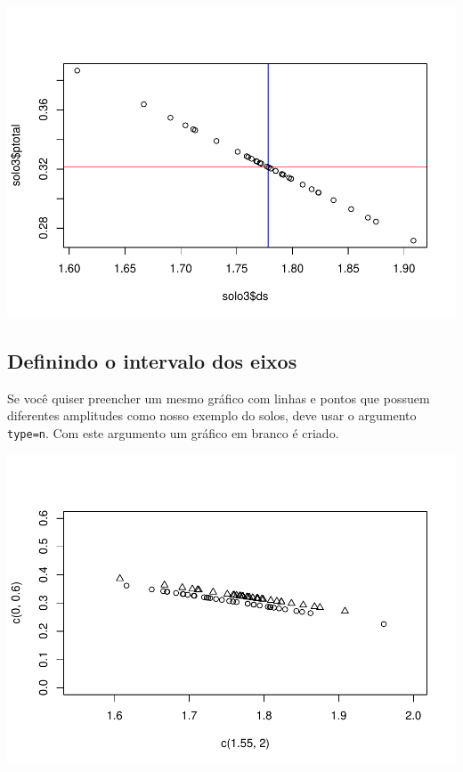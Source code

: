 \documentclass[
]{book}
\newenvironment{Shaded}{\begin{snugshade}}{\end{snugshade}}
\newcommand{\DataTypeTok}[1]{\textcolor[rgb]{0.13,0.29,0.53}{#1}}
\newcommand{\DecValTok}[1]{\textcolor[rgb]{0.00,0.00,0.81}{#1}}
\newcommand{\FloatTok}[1]{\textcolor[rgb]{0.00,0.00,0.81}{#1}}
\newcommand{\KeywordTok}[1]{\textcolor[rgb]{0.13,0.29,0.53}{\textbf{#1}}}
\newcommand{\NormalTok}[1]{#1}
\newcommand{\OperatorTok}[1]{\textcolor[rgb]{0.81,0.36,0.00}{\textbf{#1}}}
\newcommand{\StringTok}[1]{\textcolor[rgb]{0.31,0.60,0.02}{#1}}
\begin{document}
\includegraphics{TudodoR_files/figure-latex/unnamed-chunk-164-1.pdf}

\hypertarget{definindo-o-intervalo-dos-eixos}{%
\subsection{Definindo o intervalo dos eixos}\label{definindo-o-intervalo-dos-eixos}}

Se você quiser preencher um mesmo gráfico com linhas e pontos que possuem diferentes amplitudes como nosso exemplo do solos, deve usar o argumento \texttt{type=n}. Com este argumento um gráfico em branco é criado.

\begin{Shaded}
\end{Shaded}

\includegraphics{TudodoR_files/figure-latex/unnamed-chunk-165-1.pdf}
\end{document}
